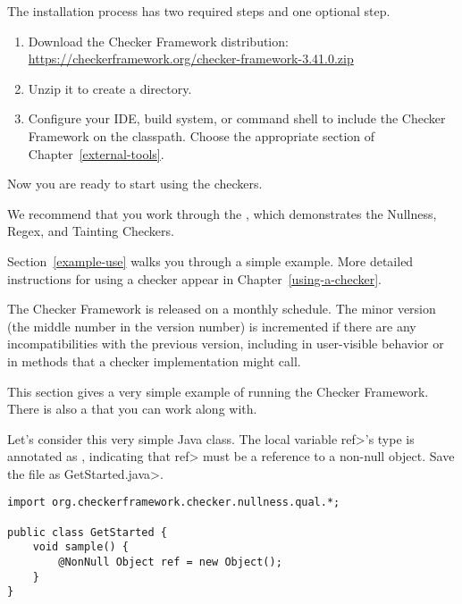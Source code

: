The installation process has two required steps and one
optional step.
\begin{enumerate}
\item
  Download the Checker Framework distribution:
  \\
  \url{https://checkerframework.org/checker-framework-3.41.0.zip}

\item
  Unzip it to create a  directory.

\item
  \label{installation-configure-step}%
  Configure your IDE, build system, or command shell to include the Checker
  Framework on the classpath.  Choose the appropriate section of
  Chapter~\ref{external-tools}.


\end{enumerate}

Now you are ready to start using the checkers.

We recommend that you work through the
, which demonstrates the Nullness, Regex, and Tainting Checkers.

Section~\ref{example-use} walks you through a simple example.  More detailed
instructions for using a checker appear in Chapter~\ref{using-a-checker}.

\label{version-number}
The Checker Framework is released on a monthly schedule.  The minor version
(the middle number in the version number) is incremented if there are any
incompatibilities
with the previous version, including in user-visible
behavior or in methods that a checker implementation might call.



This section gives a very simple example of running the Checker Framework.
There is also a 
that you can work along with.

  Let's consider this very simple Java class.  The local variable \<ref>'s type is
  annotated as , indicating that \<ref> must be a reference to a
  non-null object.  Save the file as \<GetStarted.java>.

\begin{Verbatim}
import org.checkerframework.checker.nullness.qual.*;

public class GetStarted {
    void sample() {
        @NonNull Object ref = new Object();
    }
}
\end{Verbatim}

